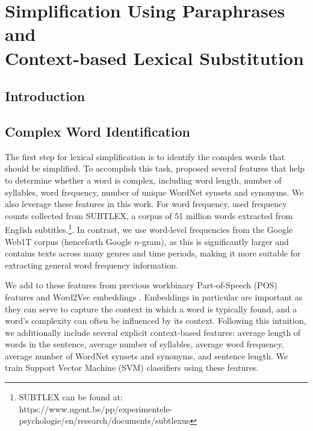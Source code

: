 \documentclass[thesis.tex]{subfiles}
\begin{document}
\chapter{Simplification Using Paraphrases and \\ Context-based Lexical Substitution}
\label{chap:lexical}

\section{Introduction}


\section{Complex Word Identification}

\noindent The first step for lexical simplification is to identify the complex words that should be simplified. 
To accomplish this task, \cite{shardlow2013cw} proposed several features that help to determine whether a word is complex, including word length, number of syllables, word frequency, number of unique WordNet synsets and synonyms. We also leverage these features in this work. For word frequency, \cite{shardlow2013cw} used frequency counts collected from SUBTLEX, a corpus of 51 million words extracted from English subtitles.\footnote{SUBTLEX can be found at: \\ https://www.ugent.be/pp/experimentele-psychologie/en/research/documents/subtlexus}. In contrast, we use word-level  frequencies from the Google Web1T corpus \citep{thorsten2006web} (henceforth Google $n$-gram), as this is significantly larger and contains texts across many genres and time periods, making it more suitable for extracting general word frequency information. 

We add to these features from previous workbinary Part-of-Speech (POS) features and Word2Vec embeddings \citep{mikolov2013efficient}. Embeddings in particular are important as they can serve to capture the context in which a word is typically found, and a word's complexity can often be influenced by its context. Following this intuition, we additionally include several explicit context-based features: average length of words in the sentence, average number of syllables, average word frequency, average number of WordNet synsets and synonyms, and sentence length. We train Support Vector Machine (SVM) classifiers using these features.
\end{document}
